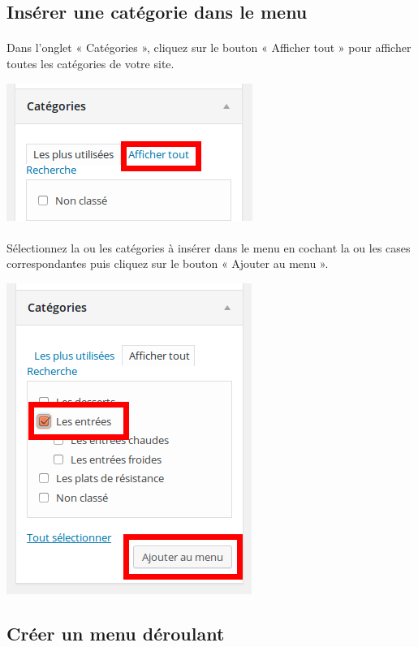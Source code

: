 \documentclass[10pt,a4paper]{article}
\begin{document}
\subsection{Insérer une catégorie dans le menu}
\paragraph{}Dans l'onglet « Catégories », cliquez sur le bouton « Afficher tout » pour afficher toutes les catégories de votre site.
\begin{center}
\includegraphics[scale=0.3]{img/0150.png}
\end{center}
\paragraph{}Sélectionnez la ou les catégories à insérer dans le menu en cochant la ou les cases correspondantes puis cliquez sur le bouton « Ajouter au menu ».
\begin{center}
\includegraphics[scale=0.3]{img/0151.png}
\end{center}
\subsection{Créer un menu déroulant}
\end{document}
